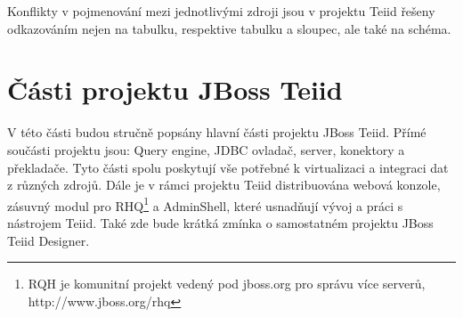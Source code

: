 \documentclass[oneside,12pt]{fithesis2}
\begin{document}
Konflikty v pojmenování mezi jednotlivými zdroji jsou v projektu Teiid řešeny odkazováním nejen na tabulku, respektive tabulku a sloupec, ale také na schéma. 

\section{Části projektu JBoss Teiid}
V této části budou stručně popsány hlavní části projektu JBoss Teiid. Přímé součásti projektu jsou: Query engine, JDBC ovladač, server, konektory a překladače. Tyto části spolu poskytují vše potřebné k virtualizaci a integraci dat z různých zdrojů. Dále je v rámci projektu Teiid distribuována webová konzole, zásuvný modul pro RHQ\footnote{RQH je komunitní projekt vedený pod jboss.org pro správu více serverů, http://www.jboss.org/rhq} a AdminShell, které usnadňují vývoj a práci s nástrojem Teiid. Také zde bude krátká zmínka o samostatném projektu JBoss Teiid Designer.
\end{document}
